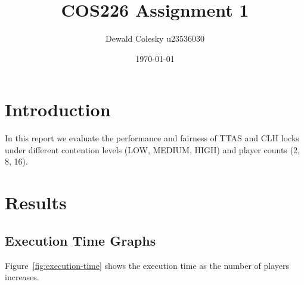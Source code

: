 \documentclass[12pt,a4paper]{article}
\title{COS226 Assignment 1}
\author{Dewald Colesky u23536030}
\date{\today}
\begin{document}
\maketitle

\section{Introduction}
In this report we evaluate the performance and fairness of TTAS and CLH locks under different contention levels (LOW, MEDIUM, HIGH) and player counts (2, 8, 16).

\clearpage
\section{Results}


\subsection{Execution Time Graphs}
Figure~\ref{fig:execution-time} shows the execution time as the number of players increases.
\end{document}
